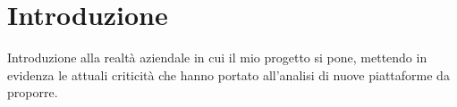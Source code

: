 \section{Introduzione}
Introduzione alla realtà aziendale in cui il mio progetto si pone, mettendo in evidenza le attuali criticità che hanno portato all'analisi di nuove piattaforme da proporre.